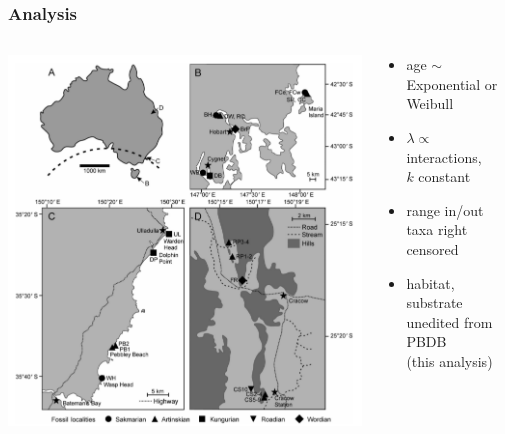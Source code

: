 \documentclass{beamer}
\begin{document}
\begin{frame}
  \frametitle{Analysis}
  \begin{columns}
    \begin{column}{0.6\textwidth}
      \includegraphics[height = 0.8\textheight, width = \textwidth, keepaspectratio = true]{figure/australia}

      \tiny{}
    \end{column}
    \begin{column}{0.4\textwidth}
      \begin{itemize}
        \item age \(\sim\) Exponential or Weibull 
        \item \(\lambda \propto\) interactions, \\\(k\) constant
        \item range in/out taxa right censored
        \item habitat, substrate unedited from PBDB \\(this analysis)
      \end{itemize}
    \end{column}
  \end{columns}
\end{frame}
\end{document}
